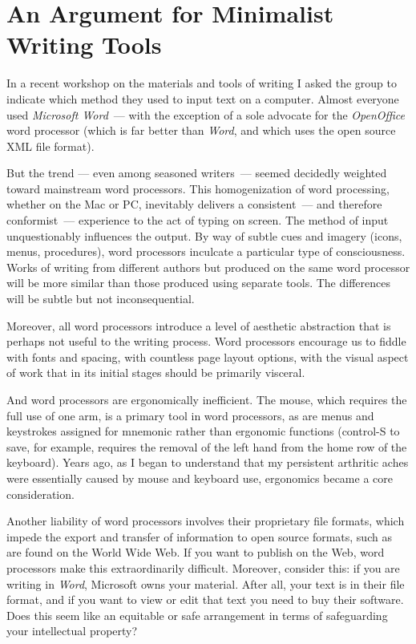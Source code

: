 \documentclass[letterpaper,10pt,headsepline]{scrreprt}
\begin{document}
\section{An Argument for Minimalist Writing Tools}
In a recent workshop on the materials and tools of writing I asked the
group to indicate which method they used to input text on a computer.
Almost everyone used \textit{Microsoft Word\/}~--- with the exception of
a sole advocate for the \textit{OpenOffice\/} word processor (which is
far better than \textit{Word}, and which uses the open source
\textsc{XML} file format).

But the trend --- even among seasoned writers~--- seemed decidedly
weighted toward mainstream word processors. This homogenization of
word processing, whether on the Mac or PC, inevitably delivers a
consistent~--- and therefore conformist~--- experience to the act of
typing on screen. The method of input unquestionably influences the
output. By way of subtle cues and imagery (icons, menus, procedures),
word processors inculcate a particular type of consciousness. Works of
writing from different authors but produced on the same word processor
will be more similar than those produced using separate tools. The
differences will be subtle but not inconsequential.

Moreover, all word processors introduce a level of aesthetic
abstraction that is perhaps not useful to the writing process. Word
processors encourage us to fiddle with fonts and spacing, with
countless page layout options, with the visual aspect of work that in
its initial stages should be primarily visceral.

And word processors are ergonomically inefficient. The mouse, which
requires the full use of one arm, is a primary tool in word
processors, as are menus and keystrokes assigned for mnemonic rather
than ergonomic functions (control-S to save, for example, requires the
removal of the left hand from the home row of the keyboard). Years
ago, as I began to understand that my persistent arthritic aches were
essentially caused by mouse and keyboard use, ergonomics became a core
consideration.

Another liability of word processors involves their proprietary file
formats, which impede the export and transfer of information to open
source formats, such as are found on the World Wide Web. If you want
to publish on the Web, word processors make this extraordinarily
difficult. Moreover, consider this: if you are writing in
\textit{Word}, Microsoft owns your material. After all, your text is
in their file format, and if you want to view or edit that text you
need to buy their software. Does this seem like an equitable or safe
arrangement in terms of safeguarding your intellectual property?
\end{document}
